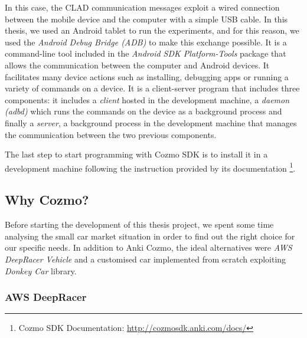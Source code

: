In this case, the CLAD communication messages exploit a wired connection between the mobile device and the computer with a simple USB cable.  In this thesis, we used an Android tablet to run the experiments, and for this reason, we used the \textit{Android Debug Bridge (ADB)} to make this exchange possible.
It is a command-line tool included in the \textit{Android SDK Platform-Tools} package that allows the communication between the computer and Android devices. It facilitates many device actions such as installing, debugging apps or running a variety of commands on a device. It is a client-server program that includes three components: it includes a \textit{client} hosted in the development machine, a \textit{daemon (adbd)} which runs the commands on the device as a background process and finally a \textit{server}, a background process in the development machine that manages the communication between the two previous components.

The last step to start programming with Cozmo SDK is to install it in a development machine following the instruction provided by its documentation \footnote{Cozmo SDK Documentation: \href{http://cozmosdk.anki.com/docs/index.html}{http://cozmosdk.anki.com/docs/}}.


\subsection{Why Cozmo?}

Before starting the development of this thesis project, we spent some time analysing the small car market situation in order to find out the right choice for our specific needs. In addition to Anki Cozmo, the ideal alternatives were \textit{AWS DeepRacer Vehicle} and a customised car implemented from scratch exploiting \textit{Donkey\textregistered
Car} library.

\subsubsection{AWS DeepRacer}


